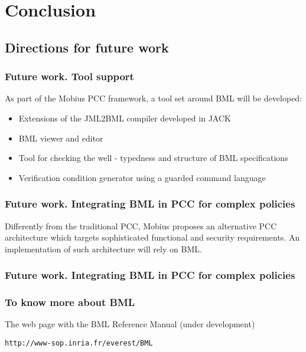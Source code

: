\documentclass[c]{beamer}
\begin{document}
\section{Conclusion}




\subsection{Directions for future work}

\begin{frame} \frametitle{Future work. Tool support}
 As part of the Mobius PCC framework, a tool set around BML  will be developed:
   \begin{itemize}
      \item  Extensions of the JML2BML compiler developed in JACK
      \item BML viewer  and  editor
      \item Tool for checking the well - typedness and structure of BML specifications
      \item Verification condition generator using a guarded command language
   \end{itemize}       
\end{frame}




\begin{frame}[shrink]\frametitle{Future work. Integrating BML in PCC for complex policies}
\vspace{3cm}
Differently from the traditional PCC, Mobius proposes an alternative PCC architecture which targets sophisticated functional and security requirements. 
An implementation of such architecture will rely  on BML.


\end{frame}

\logo{} 

\begin{frame}[shrink]\frametitle{Future work. Integrating BML in PCC for complex policies}

 \begin{center}
 \end{center}

\end{frame}

\begin{frame}\frametitle{To know more about BML } 

\vspace{2cm}
The web page with the BML Reference Manual (under development)
\begin{center}
\texttt{http://www-sop.inria.fr/everest/BML}
\end{center}
\end{frame}
\end{document}
